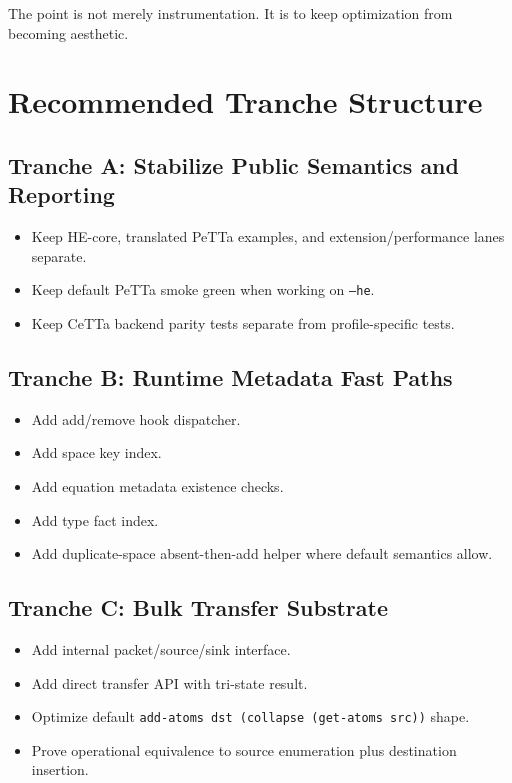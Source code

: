 \documentclass[11pt]{article}
\newcommand{\CeTTa}{CeTTa}
\newcommand{\PeTTa}{PeTTa}
\newcommand{\HE}{HE}
\begin{document}
The point is not merely instrumentation.  It is to keep optimization from becoming aesthetic.

\section{Recommended Tranche Structure}

\subsection{Tranche A: Stabilize Public Semantics and Reporting}

\begin{itemize}[leftmargin=*]
  \item Keep \HE{}-core, translated \PeTTa{} examples, and extension/performance lanes separate.
  \item Keep default \PeTTa{} smoke green when working on \texttt{--he}.
  \item Keep \CeTTa{} backend parity tests separate from profile-specific tests.
\end{itemize}

\subsection{Tranche B: Runtime Metadata Fast Paths}

\begin{itemize}[leftmargin=*]
  \item Add add/remove hook dispatcher.
  \item Add space key index.
  \item Add equation metadata existence checks.
  \item Add type fact index.
  \item Add duplicate-space absent-then-add helper where default semantics allow.
\end{itemize}

\subsection{Tranche C: Bulk Transfer Substrate}

\begin{itemize}[leftmargin=*]
  \item Add internal packet/source/sink interface.
  \item Add direct transfer API with tri-state result.
  \item Optimize default \texttt{add-atoms dst (collapse (get-atoms src))} shape.
  \item Prove operational equivalence to source enumeration plus destination insertion.
\end{itemize}
\end{document}
